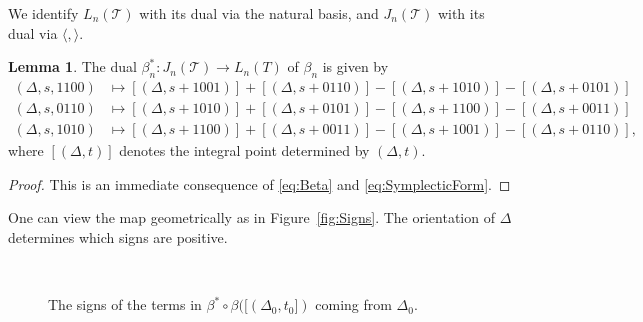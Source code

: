 \documentclass[12pt]{amsart}
\theoremstyle{definition}
\newtheorem{lemma}[theorem]{Lemma}
\numberwithin{equation}{section}
\def\T{\mathcal{T}}
\begin{document}
We identify $L_n(\T)$ with its dual via the natural basis, and $J_n(\T)$ with its dual via $\langle,\rangle$.
\begin{lemma}
The dual $\beta_n^*\colon J_n(\T)\to L_n(T)$ of $\beta_n$ is given by
\begin{equation}\label{eq:BetaStar}
\begin{aligned}
(\Delta,s,1100)&\mapsto [(\Delta,s+1001)]+[(\Delta,s+0110)]-[(\Delta,s+1010)]-[(\Delta,s+0101)]\\
(\Delta,s,0110)&\mapsto [(\Delta,s+1010)]+[(\Delta,s+0101)]-[(\Delta,s+1100)]-[(\Delta,s+0011)]\\
(\Delta,s,1010)&\mapsto [(\Delta,s+1100)]+[(\Delta,s+0011)]-[(\Delta,s+1001)]-[(\Delta,s+0110)],
\end{aligned}
\end{equation}
where $[(\Delta,t)]$ denotes the integral point determined by $(\Delta,t)$.
\end{lemma}
\begin{proof}
This is an immediate consequence of \eqref{eq:Beta} and \eqref{eq:SymplecticForm}.
\end{proof}

One can view the map geometrically as in Figure~\ref{fig:Signs}. The orientation of $\Delta$ determines which signs are positive.

\begin{figure}[htb]
\begin{center}
\begin{minipage}[b]{0.45\textwidth}
\begin{center}
\scalebox{0.75}{
}
\end{center}
\end{minipage}
\hfill
\begin{minipage}[b]{0.45\textwidth}
\begin{center}
\scalebox{0.75}{
}
\end{center}
\end{minipage}
\\
\begin{minipage}[t]{0.45\textwidth}
\caption{The signs of the terms in $\beta^*(\Delta,s,e)$.}\label{fig:Signs}
\end{minipage}
\begin{minipage}[t]{0.45\textwidth}
\caption{The signs of the terms in $\beta^*\circ\beta([(\Delta_0,t_0])$ coming from $\Delta_0$.}\label{fig:FacePointSigns}
\end{minipage}
\end{center}
\end{figure}
\end{document}
